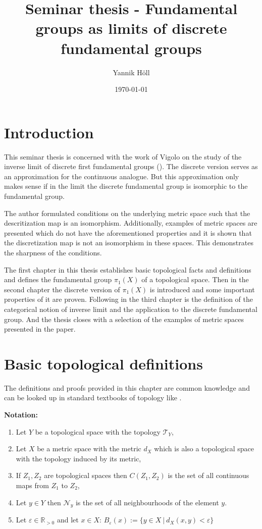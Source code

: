\documentclass[a4paper, 11pt, twoside]{article}
\title{Seminar thesis - Fundamental groups as limits of discrete fundamental groups}
\author{Yannik Höll}
\date{\today}
\newcommand{\R}[0]{\mathbb{R}}
\newcommand{\T}[0]{\mathcal{T}}
\newcommand{\NB}[0]{\mathcal{N}}
\theoremstyle{break}
\theoremstyle{break}
\begin{document}
\nocite{*}

\maketitle

\section*{Introduction}
This seminar thesis is concerned with the work of Vigolo on the study of the inverse limit of discrete first fundamental groups (\cite{vigolo2018fundamental}). The discrete version serves as an approximation
for the continuous analogue. But this approximation only makes sense if in the limit the discrete fundamental group is isomorphic to the fundamental group.

The author formulated conditions on the underlying metric space such that the descritization map is an isomorphism. 
Additionally, examples of metric spaces are presented which do not have the aforementioned properties and it is shown that the discretization map is not an isomorphism
in these spaces. This demonstrates the sharpness of the conditions.

The first chapter in this thesis establishes basic topological facts and definitions and defines the fundamental group $\pi_1(X)$ of a topological space.
Then in the second chapter the discrete version of $\pi_1(X)$ is introduced and some important properties of it are proven.
Following in the third chapter is the definition of the categorical notion of inverse limit and the application to the discrete fundamental group. 
And the thesis closes with a selection of the examples of metric spaces presented in the paper. 

\section{Basic topological definitions} \label{section-basic-defs}

The definitions and proofs provided in this chapter are common knowledge and can be looked up in standard textbooks of topology like \cite{munkres2000topology}.

\textbf{Notation:}
\begin{enumerate}
  \item Let $Y$ be a topological space with the topology $\T_Y$,
  \item Let $X$ be a metric space with the metric $d_X$ which is also a topological space with the topology induced by its metric,
  \item If $Z_1, Z_2$ are topological spaces then $C(Z_1, Z_2)$ is the set of all continuous maps from $Z_1$ to $Z_2$,
  \item Let $y \in Y$ then $\NB_y$ is the set of all neighbourhoods of the element $y$.
  \item Let $\varepsilon \in \R_{>0}$ and let $x \in X$: $B_{\varepsilon}(x) := \{ y\in X \: | \: d_X(x, y) < \varepsilon\}$
\end{enumerate}
\end{document}

